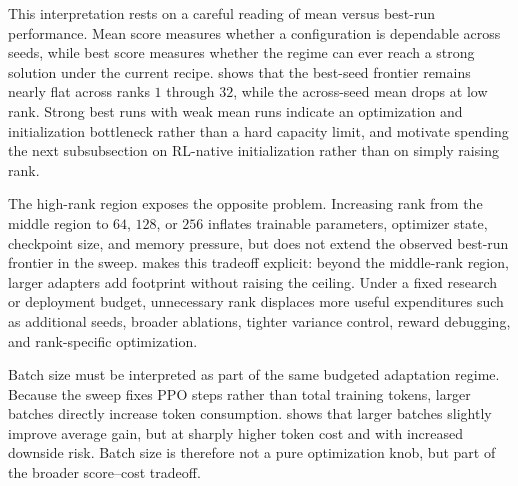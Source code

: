 \documentclass{llmxive}
\begin{document}
This interpretation rests on a careful reading of mean versus best-run performance. Mean score measures whether a configuration is dependable across seeds, while best score measures whether the regime can ever reach a strong solution under the current recipe.  shows that the best-seed frontier remains nearly flat across ranks $1$ through $32$, while the across-seed mean drops at low rank. Strong best runs with weak mean runs indicate an optimization and initialization bottleneck rather than a hard capacity limit, and motivate spending the next subsubsection on RL-native initialization rather than on simply raising rank.


The high-rank region exposes the opposite problem. Increasing rank from the middle region to $64$, $128$, or $256$ inflates trainable parameters, optimizer state, checkpoint size, and memory pressure, but does not extend the observed best-run frontier in the sweep.  makes this tradeoff explicit: beyond the middle-rank region, larger adapters add footprint without raising the ceiling. Under a fixed research or deployment budget, unnecessary rank displaces more useful expenditures such as additional seeds, broader ablations, tighter variance control, reward debugging, and rank-specific optimization.


Batch size must be interpreted as part of the same budgeted adaptation regime. Because the sweep fixes PPO steps rather than total training tokens, larger batches directly increase token consumption.  shows that larger batches slightly improve average gain, but at sharply higher token cost and with increased downside risk. Batch size is therefore not a pure optimization knob, but part of the broader score--cost tradeoff.
\end{document}
